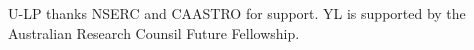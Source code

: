 \documentclass[useAMS,usenatbib]{mn2e}
\begin{document}
U-LP thanks NSERC and CAASTRO for support. YL is supported 
by the Australian Research Counsil Future Fellowship.


\newcommand{\araa}{ARA\&A}   %
\newcommand{\afz}{Afz}       %
\newcommand{\aj}{AJ}         %
\newcommand{\azh}{AZh}       %
\newcommand{\aaa}{A\&A}      %
\newcommand{\aas}{A\&AS}     %
\newcommand{\aar}{A\&AR}     %
\newcommand{\apj}{ApJ}       %
\newcommand{\apjs}{ApJS}     %
\newcommand{\apjl}{ApJ}      %
\newcommand{\apss}{Ap\&SS}   %
\newcommand{\baas}{BAAS}     %
\newcommand{\jaa}{JA\&A}     %
\newcommand{\mnras}{MNRAS}   %
\newcommand{\nat}{Nat}       %
\newcommand{\pasj}{PASJ}     %
\newcommand{\pasp}{PASP}     %
\newcommand{\paspc}{PASPC}   %
\newcommand{\qjras}{QJRAS}   %
\newcommand{\sci}{Sci}       %
\newcommand{\solphys}{Solar Physics}       %
\newcommand{\sova}{SvA}      %
\newcommand{\aap}{A\&A}






\label{lastpage}
\end{document}
